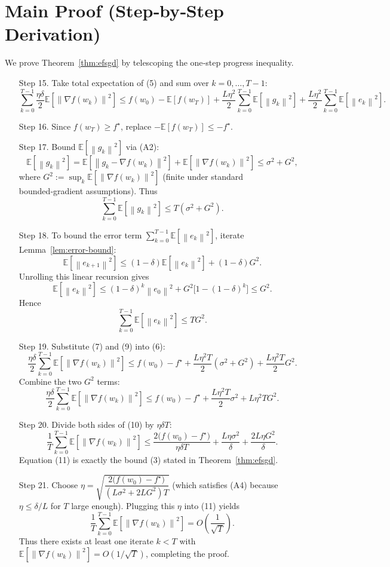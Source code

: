 \documentclass{article}
\newcommand{\E}{\mathbb{E}}
\newcommand{\norm}[1]{\left\|#1\right\|}
\begin{document}
\newpage

\section*{Main Proof (Step‑by‑Step Derivation)}
We prove Theorem~\ref{thm:efsgd} by telescoping the one‑step progress inequality.

\begin{enumerate}
\item[Step 15.] Take total expectation of (5) and sum over $k=0,\dots,T-1$:
\[
\sum_{k=0}^{T-1}\frac{\eta\delta}{2}\E\!\left[\norm{\nabla f(w_k)}^2\right]
\le f(w_0)-\E[f(w_T)]
   +\frac{L\eta^2}{2}\sum_{k=0}^{T-1}\E\!\left[\norm{g_k}^2\right]
   +\frac{L\eta^2}{2}\sum_{k=0}^{T-1}\E\!\left[\norm{e_k}^2\right].
\tag{6}
\]
\item[Step 16.] Since $f(w_T)\ge f^\star$, replace $-\E[f(w_T)]\le -f^\star$.
\item[Step 17.] Bound $\E\!\left[\norm{g_k}^2\right]$ via (A2):
\[
\E\!\left[\norm{g_k}^2\right]
= \E\!\left[\norm{g_k-\nabla f(w_k)}^2\right]
  +\E\!\left[\norm{\nabla f(w_k)}^2\right]
\le \sigma^2+G^2,
\]
where $G^2:=\sup_k\E\!\left[\norm{\nabla f(w_k)}^2\right]$ (finite under standard bounded‑gradient assumptions).  
Thus
\[
\sum_{k=0}^{T-1}\E\!\left[\norm{g_k}^2\right]\le T(\sigma^2+G^2).
\tag{7}
\]
\item[Step 18.] To bound the error term $\sum_{k=0}^{T-1}\E[\norm{e_k}^2]$, iterate Lemma~\ref{lem:error-bound}:
\[
\E[\norm{e_{k+1}}^2]\le (1-\delta)\E[\norm{e_k}^2]+(1-\delta)G^2 .
\]
Unrolling this linear recursion gives
\[
\E[\norm{e_k}^2]\le (1-\delta)^k\norm{e_0}^2+G^2\bigl[1-(1-\delta)^k\bigr]\le G^2 .
\tag{8}
\]
Hence
\[
\sum_{k=0}^{T-1}\E[\norm{e_k}^2]\le TG^2 .
\tag{9}
\]
\item[Step 19.] Substitute (7) and (9) into (6):
\[
\frac{\eta\delta}{2}\sum_{k=0}^{T-1}\E\!\left[\norm{\nabla f(w_k)}^2\right]
\le f(w_0)-f^\star
   +\frac{L\eta^2T}{2}(\sigma^2+G^2)
   +\frac{L\eta^2T}{2}G^2 .
\]
Combine the two $G^2$ terms:
\[
\frac{\eta\delta}{2}\sum_{k=0}^{T-1}\E\!\left[\norm{\nabla f(w_k)}^2\right]
\le f(w_0)-f^\star
   +\frac{L\eta^2T}{2}\sigma^2
   +L\eta^2T G^2 .
\tag{10}
\]
\item[Step 20.] Divide both sides of (10) by $\eta\delta T$:
\[
\frac1T\sum_{k=0}^{T-1}\E\!\left[\norm{\nabla f(w_k)}^2\right]
\le \frac{2\bigl(f(w_0)-f^\star\bigr)}{\eta\delta T}
   +\frac{L\eta\sigma^2}{\delta}
   +\frac{2L\eta G^2}{\delta}.
\tag{11}
\]
Equation (11) is exactly the bound (3) stated in Theorem~\ref{thm:efsgd}.
\item[Step 21.] Choose $\eta = \sqrt{\dfrac{2\bigl(f(w_0)-f^\star\bigr)}{(L\sigma^2+2LG^2)T}}$ (which satisfies (A4) because $\eta\le\delta/L$ for $T$ large enough).  
Plugging this $\eta$ into (11) yields
\[
\frac1T\sum_{k=0}^{T-1}\E\!\left[\norm{\nabla f(w_k)}^2\right]
= O\!\left(\frac{1}{\sqrt{T}}\right).
\]
Thus there exists at least one iterate $k<T$ with $\E[\norm{\nabla f(w_k)}^2]=O(1/\sqrt{T})$, completing the proof.
\end{enumerate}
\end{document}
